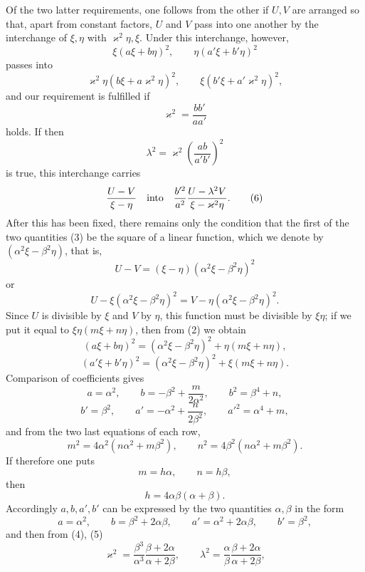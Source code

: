 \documentclass[11pt]{article}
\begin{document}
Of the two latter requirements, one follows from the other if $U,V$ are arranged so that, apart from constant factors, $U$ and $V$ pass into one another by the interchange of $\xi,\eta$ with $\varkappa^2\eta,\xi$. Under this interchange, however,
\[
\xi(a\xi+b\eta)^2,\qquad \eta(a'\xi+b'\eta)^2
\]
passes into
\[
\varkappa^2\eta(b\xi+a\varkappa^2\eta)^2,\qquad
\xi(b'\xi+a'\varkappa^2\eta)^2,
\]
and our requirement is fulfilled if
\begin{equation}
\varkappa^2=\frac{bb'}{aa'}
\tag{4}
\end{equation}
holds. If then
\begin{equation}
\lambda^2=\varkappa^2\left(\frac{ab}{a'b'}\right)^2
\tag{5}
\end{equation}
is true, this interchange carries
\begin{equation}
\frac{U-V}{\xi-\eta}\quad\hbox{into}\quad
\frac{b'^2}{a^2}\frac{U-\lambda^2V}{\xi-\varkappa^2\eta}.
\tag{6}
\end{equation}
After this has been fixed, there remains only the condition that the first of the two quantities (3) be the square of a linear function, which we denote by $(\alpha^2\xi-\beta^2\eta)$, that is,
\begin{equation}
U-V=(\xi-\eta)(\alpha^2\xi-\beta^2\eta)^2
\tag{7}
\end{equation}
or
\[
U-\xi(\alpha^2\xi-\beta^2\eta)^2
=
V-\eta(\alpha^2\xi-\beta^2\eta)^2.
\]
Since $U$ is divisible by $\xi$ and $V$ by $\eta$, this function must be divisible by $\xi\eta$; if we put it equal to $\xi\eta(m\xi+n\eta)$, then from (2) we obtain
\[
(a\xi+b\eta)^2=(\alpha^2\xi-\beta^2\eta)^2+\eta(m\xi+n\eta),
\]
\[
(a'\xi+b'\eta)^2=(\alpha^2\xi-\beta^2\eta)^2+\xi(m\xi+n\eta).
\]
Comparison of coefficients gives
\[
a=\alpha^2,\qquad b=-\beta^2+\frac{m}{2\alpha^2},\qquad b^2=\beta^4+n,
\]
\[
b'=\beta^2,\qquad a'=-\alpha^2+\frac{n}{2\beta^2},\qquad a'^2=\alpha^4+m,
\]
and from the two last equations of each row,
\[
m^2=4\alpha^2(n\alpha^2+m\beta^2),\qquad
n^2=4\beta^2(n\alpha^2+m\beta^2).
\]
If therefore one puts
\[
m=h\alpha,\qquad n=h\beta,
\]
then
\[
h=4\alpha\beta(\alpha+\beta).
\]
Accordingly $a,b,a',b'$ can be expressed by the two quantities $\alpha,\beta$ in the form
\begin{equation}
a=\alpha^2,\qquad b=\beta^2+2\alpha\beta,\qquad
a'=\alpha^2+2\alpha\beta,\qquad b'=\beta^2,
\tag{8}
\end{equation}
and then from (4), (5)
\begin{equation}
\varkappa^2=\frac{\beta^3}{\alpha^3}\frac{\beta+2\alpha}{\alpha+2\beta},
\qquad
\lambda^2=\frac{\alpha}{\beta}\frac{\beta+2\alpha}{\alpha+2\beta},
\tag{9}
\end{equation}
\end{document}
